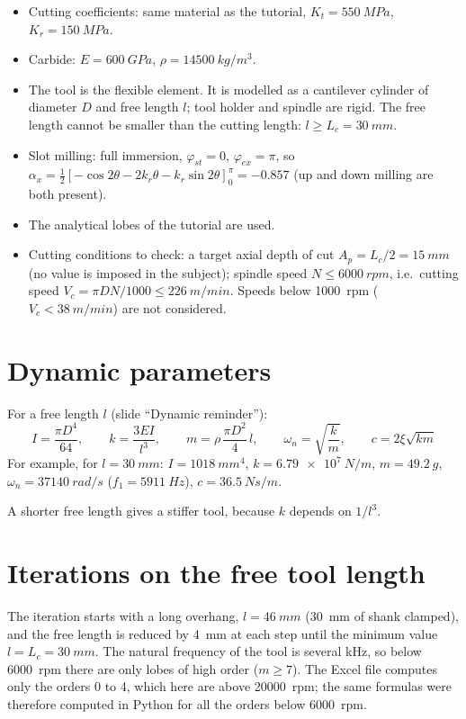 \documentclass[11pt,a4paper]{article}
\begin{document}
\begin{itemize}
  \item Cutting coefficients: same material as the tutorial, $K_t=\SI{550}{MPa}$,
        $K_r=\SI{150}{MPa}$.
  \item Carbide: $E=\SI{600}{GPa}$, $\rho=\SI{14500}{kg/m^3}$.
  \item The tool is the flexible element. It is modelled as a cantilever cylinder of
        diameter $D$ and free length $l$; tool holder and spindle are rigid. The free length
        cannot be smaller than the cutting length: $l\geq L_c=\SI{30}{mm}$.
  \item Slot milling: full immersion, $\varphi_{st}=0$, $\varphi_{ex}=\pi$, so
        $\alpha_x=\frac12[-\cos2\theta-2k_r\theta-k_r\sin2\theta]_0^\pi=-0.857$
        (up and down milling are both present).
  \item The analytical lobes of the tutorial are used.
  \item Cutting conditions to check: a target axial depth of cut $A_p=L_c/2=\SI{15}{mm}$
        (no value is imposed in the subject); spindle speed $N\leq\SI{6000}{rpm}$, i.e.\
        cutting speed $V_c=\pi D N/1000\leq\SI{226}{m/min}$. Speeds below \SI{1000}{rpm}
        ($V_c<\SI{38}{m/min}$) are not considered.
\end{itemize}

\section{Dynamic parameters}
For a free length $l$ (slide ``Dynamic reminder''):
\begin{equation}
I=\frac{\pi D^4}{64},\qquad k=\frac{3EI}{l^3},\qquad m=\rho\,\frac{\pi D^2}{4}\,l,\qquad
\omega_n=\sqrt{\frac km},\qquad c=2\xi\sqrt{km}
\end{equation}
For example, for $l=\SI{30}{mm}$: $I=\SI{1018}{mm^4}$, $k=\SI{6.79e7}{N/m}$,
$m=\SI{49.2}{g}$, $\omega_n=\SI{37140}{rad/s}$ ($f_1=\SI{5911}{Hz}$), $c=\SI{36.5}{Ns/m}$.

A shorter free length gives a stiffer tool, because $k$ depends on $1/l^3$.

\section{Iterations on the free tool length}
The iteration starts with a long overhang, $l=\SI{46}{mm}$ (\SI{30}{mm} of shank clamped),
and the free length is reduced by \SI{4}{mm} at each step until the minimum value
$l=L_c=\SI{30}{mm}$. The natural frequency of the tool is several kHz, so below
\SI{6000}{rpm} there are only lobes of high order ($m\geq 7$). The Excel file computes only
the orders 0 to 4, which here are above \SI{20000}{rpm}; the same formulas were therefore
computed in Python for all the orders below \SI{6000}{rpm}.
\end{document}
